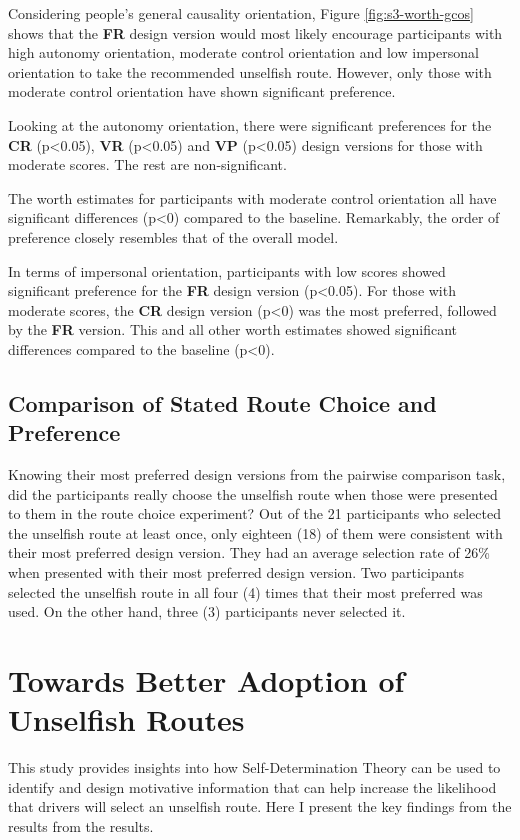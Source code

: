 Considering people's general causality orientation, Figure \ref{fig:s3-worth-gcos} shows that the \textbf{FR} design version would most likely encourage participants with high autonomy orientation, moderate control orientation and low impersonal orientation to take the recommended unselfish route. However, only those with moderate control orientation have shown significant preference.

Looking at the autonomy orientation, there were significant preferences for the \textbf{CR} (p<0.05), \textbf{VR} (p<0.05) and \textbf{VP} (p<0.05) design versions for those with moderate scores. The rest are non-significant. 

The worth estimates for participants with moderate control orientation all have significant differences (p<0) compared to the baseline. Remarkably, the order of preference closely resembles that of the overall model.

In terms of impersonal orientation, participants with low scores showed significant preference for the \textbf{FR} design version (p<0.05). For those with moderate scores, the \textbf{CR} design version (p<0) was the most preferred, followed by the \textbf{FR} version. This and all other worth estimates showed significant differences compared to the baseline (p<0). 

\subsection{Comparison of Stated Route Choice and Preference}
Knowing their most preferred design versions from the pairwise comparison task, did the participants really choose the unselfish route when those were presented to them in the route choice experiment? Out of the 21 participants who selected the unselfish route at least once, only eighteen (18) of them were consistent with their most preferred design version. They had an average selection rate of 26\% when presented with their most preferred design version. Two participants selected the unselfish route in all four (4) times that their most preferred was used. On the other hand, three (3) participants never selected it.

\section{Towards Better Adoption of Unselfish Routes}
This study provides insights into how Self-Determination Theory can be used to identify and design motivative information that can help increase the likelihood that drivers will select an unselfish route. Here I present the key findings from the results from the results. 

